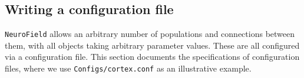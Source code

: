 \documentclass[12pt,a4paper]{article}
\newcommand{\type}[1]{ {\small\small\tt #1} }
\newcommand{\NF}[0]{ \type{NeuroField}}
\begin{document}




\subsection{Writing a configuration file}
\label{sec:config}

\NF allows an arbitrary number of populations and connections between them, with all objects taking arbitrary parameter values. These are all configured via a configuration file. This section documents the specifications of configuration files, where we use \type{Configs/cortex.conf} as an illustrative example.
\end{document}
